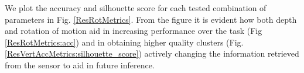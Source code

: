 \documentclass[]{interact}
\theoremstyle{plain}%
\theoremstyle{definition}
\theoremstyle{remark}
\begin{document}
%	


\noindent We plot the accuracy and silhouette score for each tested combination of parameters in Fig. \ref{ResRotMetrics}. From the figure it is evident how both depth and rotation of motion aid in increasing performance over the task (Fig \ref{ResRotMetrics:acc}) and in obtaining higher quality clusters (Fig. \ref{ResVertAccMetrics:silhouette_score}) actively changing the information retrieved from the sensor to aid in future inference.
\end{document}
